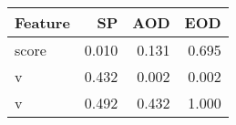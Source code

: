 \begin{tabular}{lrrr}
\toprule
Feature & SP & AOD & EOD \\
\midrule
score & 0.010 & 0.131 & 0.695 \\
v & 0.432 & 0.002 & 0.002 \\
v & 0.492 & 0.432 & 1.000 \\
\bottomrule
\end{tabular}
